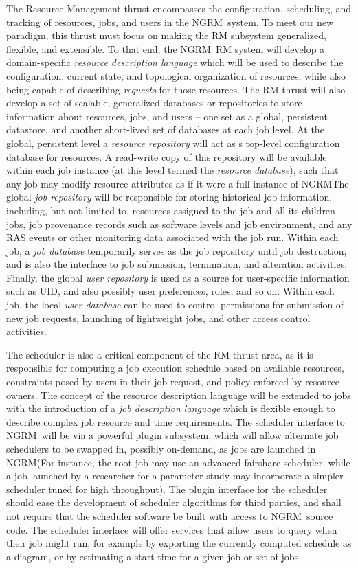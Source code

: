 \documentclass{article}
\newcommand{\ngrm}{NGRM}
\begin{document}
The Resource Management thrust encompasses the configuration,
scheduling, and tracking of resources, jobs, and users in the \ngrm\
system. To meet our new paradigm, this thrust must focus on making
the RM subsystem generalized, flexible, and extensible. To that
end, the \ngrm\ RM system will develop a domain-specific {\em
resource description language} which will be used to describe
the configuration, current state, and topological organization of
resources, while also being capable of describing {\em requests} for
those resources.  The RM thrust will also develop a set of scalable,
generalized databases or repositories to store information about
resources, jobs, and users -- one set as a global, persistent
datastore, and another short-lived set of databases at each job
level. At the global, persistent level a {\em resource repository}
will act as s top-level configuration database for resources. A
read-write copy of this repository will be available within each
job instance (at this level termed the {\em resource database}),
such that any job may modify resource attributes as if it were a
full instance of \ngrm\. The global {\em job repository} will be
responsible for storing historical job information, including,
but not limited to, resources assigned to the job and all its
children jobs, job provenance records such as software levels
and job environment, and any RAS events or other monitoring data
associated with the job run. Within each job, a {\em job database}
temporarily serves as the job repository until job destruction,
and is also the interface to job submission, termination, and
alteration activities.  Finally, the global {\em user repository}
is used as a source for user-specific information such as UID, and
also possibly user preferences, roles, and so on. Within each job,
the local {\em user database} can be used to control permissions
for submission of new job requests, launching of lightweight jobs,
and other access control activities.

The scheduler is also a critical component of the RM thrust area,
as it is responsible for computing a job execution schedule based
on available resources, constraints posed by users in their job
request, and policy enforced by resource owners. The concept of
the resource description language will be extended to jobs with the
introduction of a {\em job description language} which is flexible
enough to describe complex job resource and time requirements. The
scheduler interface to \ngrm\ will be via a powerful plugin
subsystem, which will allow alternate job schedulers to be swapped
in, possibly on-demand, as jobs are launched in \ngrm\. (For
instance, the root job may use an advanced fairshare scheduler,
while a job launched by a researcher for a parameter study may
incorporate a simpler scheduler tuned for high throughput). The
plugin interface for the scheduler should ease the development of
scheduler algorithms for third parties, and shall not require that
the scheduler software be built with access to \ngrm\ source code.
The scheduler interface will offer services that allow users
to query when their job might run, for example by exporting
the currently computed schedule as a diagram, or by estimating
a start time for a given job or set of jobs.
\end{document}
